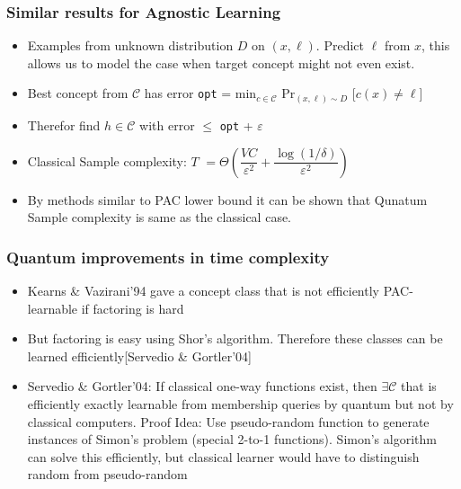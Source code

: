 \documentclass{beamer}
\begin{document}
\begin{frame}
\frametitle{Similar results for Agnostic Learning}
    \begin{itemize}
       \item Examples from unknown distribution $D$ on $(x, \ell)$. Predict
       $\ell$ from $x$, this allows us to model the case when 
       target concept might not even exist.

       \item Best concept from $\mathcal{C}$ has error \texttt{opt} = min$_{c \in \mathcal{C}}$ Pr$_{(x, \ell) \sim D}$ [$c(x) \neq \ell$]
       \item Therefor find $h \in \mathcal{C}$ with error $\leq$ \texttt{opt} + $\varepsilon$
       \item Classical Sample complexity: $T$ $= \Theta(\dfrac{VC}{\varepsilon^{2}} + \dfrac{\log(1/\delta)}{\varepsilon^{2}} )$
       \item By methods similar to PAC lower bound it can be shown that Qunatum Sample complexity is same as the classical case.
    \end{itemize}
\end{frame}


\begin{frame}
\frametitle{Quantum improvements in time complexity}
    \begin{itemize}
        \item Kearns \& Vazirani’94 gave a concept class 
        that is not efficiently PAC-learnable if factoring is hard

        \item But factoring is easy using Shor's algorithm. Therefore
        these classes can be learned efficiently[Servedio \&
        Gortler’04]

        \item Servedio \& Gortler’04: If classical one-way functions exist,
        then $\exists \mathcal{C}$ that is efficiently exactly learnable from membership
        queries by quantum but not by classical computers.
        Proof Idea: Use pseudo-random function to generate instances
        of Simon’s problem (special 2-to-1 functions). Simon’s
        algorithm can solve this efficiently, but classical learner would
        have to distinguish random from pseudo-random
    \end{itemize}
\end{frame}
\end{document}

